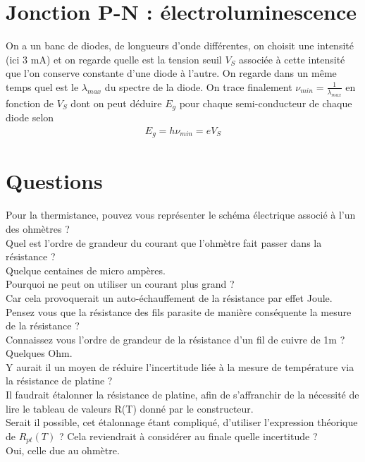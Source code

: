 \documentclass[12pt,prb,aps,epsf]{report}
\begin{document}
\section{Jonction P-N : électroluminescence}
On a un banc de diodes, de longueurs d'onde différentes, on choisit une intensité (ici 3 mA) et on regarde quelle est la tension seuil $V_S$ associée à cette intensité que l'on conserve constante d'une diode à l'autre. On regarde dans un même temps quel est le $\lambda_{max}$ du spectre de la diode. On trace finalement $\nu_{min} = \frac{1}{\lambda_{max}}$ en fonction de $V_S$ dont on peut déduire $E_g$ pour chaque semi-conducteur de chaque diode selon
\begin{eqnarray}
E_g = h\nu_{min} = eV_S
\end{eqnarray}

\section*{Questions}
Pour la thermistance, pouvez vous représenter le schéma électrique associé à l'un des ohmètres ?\\

Quel est l'ordre de grandeur du courant que l'ohmètre fait passer dans la résistance ?\\ 
Quelque centaines de micro ampères.\\

Pourquoi ne peut on utiliser un courant plus grand ?\\

Car cela provoquerait un auto-échauffement de la résistance par effet Joule.\\

Pensez vous que la résistance des fils parasite de manière conséquente la mesure de la résistance ?\\

Connaissez vous l'ordre de grandeur de la résistance d'un fil de cuivre de 1m ?\\
Quelques Ohm.\\

Y aurait il un moyen de réduire l'incertitude liée à la mesure de température via la résistance de platine ?\\
Il faudrait étalonner la résistance de platine, afin de s'affranchir de la nécessité de lire le tableau de valeurs R(T) donné par le constructeur.\\

Serait il possible, cet étalonnage étant compliqué, d'utiliser l'expression théorique de $R_{pt}(T)$ ? Cela reviendrait à considérer au finale quelle incertitude ?\\
Oui, celle due au ohmètre.\\
\end{document}

